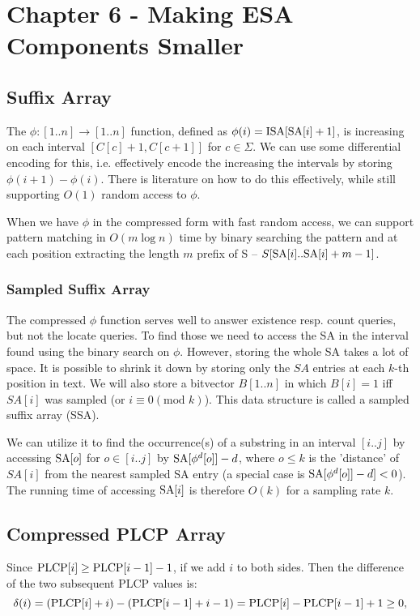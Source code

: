 \hypertarget{chapter-6---making-esa-components-smaller}{%
\section{Chapter 6 - Making ESA Components Smaller}\label{chapter-6---making-esa-components-smaller}}

\subsection{Suffix Array}
The $\phi: [1..n] \to [1..n]$ function, defined as $\phi(i) = \text{ISA}[\text{SA}[i]+1]$, is increasing on each interval $[C[c]+1, C[c+1]]$ for $c \in \Sigma$.
We can use some differential encoding for this, i.e. effectively encode the increasing the intervals by storing $\phi(i+1) - \phi(i)$.
There is literature on how to do this effectively, while still supporting $O(1)$ random access to $\phi$.\

When we have $\phi$ in the compressed form with fast random access, we can support pattern matching in $O(m \log n)$ time by binary searching the pattern and at each position extracting the length $m$ prefix of S -- $S[\text{SA}[i] .. \text{SA}[i] + m -1]$.

\subsubsection{Sampled Suffix Array}
The compressed $\phi$ function serves well to answer existence resp. count queries, but not the locate queries.
To find those we need to access the SA in the interval found using the binary search on $\phi$.
However, storing the whole SA takes a lot of space.
It is possible to shrink it down by storing only the $SA$ entries at each $k$-th position in text.
We will also store a bitvector $B[1..n]$ in which $B[i] = 1$ iff $SA[i]$ was sampled (or $i \equiv 0 (\text{mod } k)$).
This data structure is called a sampled suffix array (SSA).

We can utilize it to find the occurrence(s) of a substring in an interval $[i..j]$ by accessing $\text{SA}[o]$ for $o \in [i..j]$ by $\text{SA}[\phi^d[o]] - d$, where $o \leq k$ is the 'distance' of $SA[i]$ from the nearest sampled SA entry (a special case is $\text{SA}[\phi^d[o]] - d] < 0$).
The running time of accessing $\text{SA}[i]$ is therefore $O(k)$ for a sampling rate $k$.

\subsection{Compressed PLCP Array}
Since $\text{P}\text{LCP}[i] \geq \text{P}\text{LCP}[i-1]-1$, if we add $i$ to both sides. Then the difference of the two subsequent PLCP values is:
$$\delta(i) = (\text{P}\text{LCP}[i] + i) - (\text{P}\text{LCP}[i-1] + i - 1) = \text{P}\text{LCP}[i] - \text{P}\text{LCP}[i-1] + 1 \geq 0,$$

